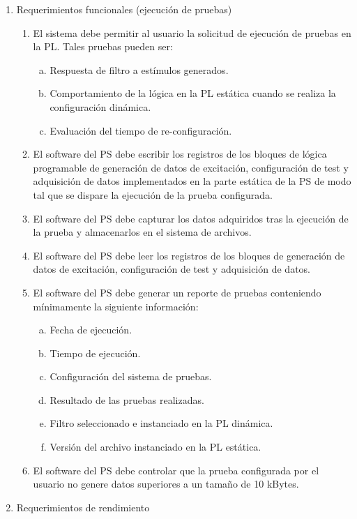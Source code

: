 \documentclass[
11pt, %
]{charter}
\begin{document}
\begin{enumerate}
	
	\item Requerimientos funcionales (ejecución de pruebas)
	\begin{enumerate}
		\item El sistema debe permitir al usuario la solicitud de ejecución de pruebas en la PL. Tales pruebas pueden ser:
		\begin{enumerate}[a.]
			\item Respuesta de filtro a estímulos generados.
			\item Comportamiento de la lógica en la PL estática cuando se realiza la configuración dinámica.
			\item Evaluación del tiempo de re-configuración.
		\end{enumerate}
		\item El software del PS debe escribir los registros de los bloques de lógica programable de generación de datos de excitación, configuración de test y adquisición de datos implementados en la parte estática de la PS de modo tal que se dispare la ejecución de la prueba configurada.
		\item El software del PS debe capturar los datos adquiridos tras la ejecución de la prueba y almacenarlos en el sistema de archivos.
		\item El software del PS debe leer los registros de los bloques de generación de datos de excitación, configuración de test y adquisición de datos.
		\item El software del PS debe generar un reporte de pruebas conteniendo mínimamente la siguiente información:
		\begin{enumerate}[a.]
			\item Fecha de ejecución.
			\item Tiempo de ejecución.
			\item Configuración del sistema de pruebas.
			\item Resultado de las pruebas realizadas.
			\item Filtro seleccionado e instanciado en la PL dinámica.
			\item Versión del archivo instanciado en la PL estática.	
		\end{enumerate}
		\item El software del PS debe controlar que la prueba configurada por el usuario no genere datos superiores a un tamaño de 10 kBytes.
	\end{enumerate}
	\item Requerimientos de rendimiento
	\begin{enumerate}

\end{enumerate}
\end{enumerate}
\end{document}
